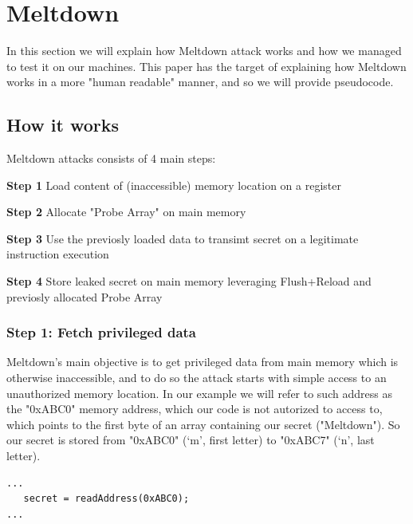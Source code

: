 \section{Meltdown}
In this section we will explain how Meltdown attack works and how we managed to
test it on our machines. This paper has the target of explaining how Meltdown works in a more "human readable" manner, and so we will provide pseudocode.

\subsection{How it works}
Meltdown attacks consists of 4 main steps:

\textbf{Step 1} Load content of (inaccessible) memory location on a register

\textbf{Step 2} Allocate "Probe Array" on main memory

\textbf{Step 3} Use the previosly loaded data to transimt secret on a legitimate instruction execution

\textbf{Step 4} Store leaked secret on main memory leveraging Flush+Reload and previosly allocated Probe Array

\subsubsection{Step 1: Fetch privileged data}
Meltdown's main objective is to get privileged data from main memory which is otherwise inaccessible, and to do so
the attack starts with simple access to an unauthorized memory location.
In our example we will refer to such address as the "0xABC0" memory address, which our code is not autorized to access to,
which points to the first byte of an array containing our secret ("Meltdown").
So our secret is stored from "0xABC0" (`m', first letter) to "0xABC7" (`n', last letter).

\begin{Verbatim}[fontsize=\small]
...
   secret = readAddress(0xABC0);
...
\end{Verbatim}

